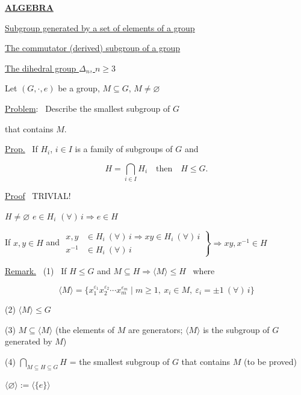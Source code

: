 \documentclass[12pt]{article}
\begin{document}
\begin{center}
\underline{\textbf{ALGEBRA}} \hfill {}\\[4pt]
\end{center}

\bigskip
\noindent\underline{Subgroup generated by a set of elements of a group}

\noindent\underline{The commutator (derived) subgroup of a group}

\noindent\underline{The dihedral group $\Delta_n$, $n\geq 3$}

\bigskip
\bigskip
\noindent Let $(G,\cdot,e)$ be a group, $M\subseteq G$, $M\neq\varnothing$

\noindent\underline{Problem}: \ Describe the smallest subgroup of $G$

\noindent that contains $M$.

\bigskip
\noindent\underline{Prop.} \ If $H_i$, $i\in I$ is a family of subgroups of $G$ and

\[
H=\bigcap_{i\in I} H_i \quad \text{then} \quad H\leq G.
\]

\bigskip
\noindent\underline{Proof} \ TRIVIAL!

\noindent $H\neq\varnothing$ \quad $e\in H_i$ $(\forall)\,i \Rightarrow e\in H$

\noindent If $x,y\in H$ and $\left.\begin{aligned}x,y&\in H_i\ (\forall)\,i \Rightarrow xy\in H_i\ (\forall)\,i\\ x^{-1}&\in H_i\ (\forall)\,i\end{aligned}\right\} \Rightarrow xy,x^{-1}\in H$

\bigskip
\noindent\underline{Remark.} \ (1) \ If $H\leq G$ and $M\subseteq H \Rightarrow \langle M\rangle \leq H$ \ where

\[
\langle M\rangle = \{x_1^{\varepsilon_1}x_2^{\varepsilon_2}\cdots x_m^{\varepsilon_m} \mid m\geq 1,\ x_i\in M,\ \varepsilon_i=\pm 1\ (\forall)\,i\}
\]

\noindent (2) $\langle M\rangle \leq G$

\noindent (3) $M\subseteq \langle M\rangle$ \quad (the elements of $M$ are generators; $\langle M\rangle$ is the subgroup of $G$ generated by $M$)

\noindent (4) $\displaystyle\bigcap_{M\subseteq H\subseteq G} H$ = the smallest subgroup of $G$ that contains $M$ \quad (to be proved)

\bigskip
\noindent $\langle\varnothing\rangle := \langle\{e\}\rangle$
\end{document}
